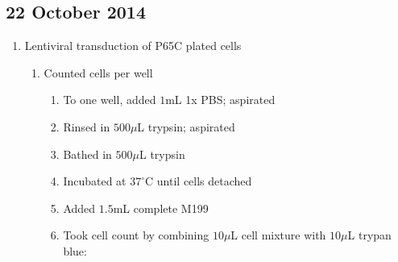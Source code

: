 \subsection*{22 October 2014}
\begin{enumerate}
	\item Lentiviral transduction of P65C plated cells
		\begin{enumerate}
			\item Counted cells per well
				\begin{enumerate}
					\item To one well, added $1$mL 1x PBS; aspirated
					\item Rinsed in $500\mu$L trypsin; aspirated
					\item Bathed in $500\mu$L trypsin
					\item Incubated at $37^{\circ}$C until cells detached
					\item Added $1.5$mL complete M199
					\item Took cell count by combining $10\mu$L cell mixture with $10\mu$L trypan blue:
			

\end{enumerate}
\end{enumerate}
\end{enumerate}
